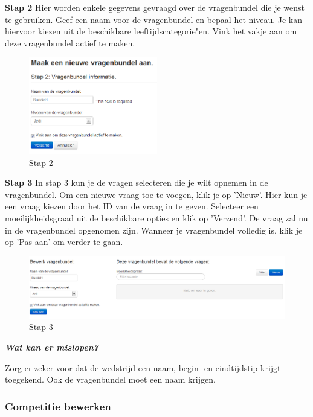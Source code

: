 \documentclass[]{article}
\begin{document}
\textbf{Stap 2}
Hier worden enkele gegevens gevraagd over de vragenbundel die je wenst te gebruiken. 
Geef een naam voor de vragenbundel en bepaal het niveau. Je kan hiervoor kiezen uit de beschikbare leeftijdscategorie"en. Vink het vakje aan om deze vragenbundel actief te maken.

\begin{figure}[!ht]
	\centering
	\includegraphics[width=0.5\textwidth]{img/stap2}
	\caption{Stap 2}
	\label{stap2}
\end{figure}

\textbf{Stap 3}
In stap 3 kun je de vragen selecteren die je wilt opnemen in de vragenbundel. Om een nieuwe vraag toe te voegen, klik je op 'Nieuw'. Hier kun je een vraag kiezen door het ID van de vraag in te geven. Selecteer een moeilijkheidsgraad uit de beschikbare opties en klik op 'Verzend'. De vraag zal nu in de vragenbundel opgenomen zijn. Wanneer je vragenbundel volledig is, klik je op 'Pas aan' om verder te gaan.

\begin{figure}[!ht]
	\centering
	\includegraphics[width=1\textwidth]{img/stap3}
	\caption{Stap 3}
	\label{stap3}
\end{figure}

\textbf{\textit{Wat kan er mislopen?}}

Zorg er zeker voor dat de wedstrijd een naam, begin- en eindtijdstip krijgt toegekend. Ook de vragenbundel moet een naam krijgen.

\subsubsection{Competitie bewerken}
\end{document}
